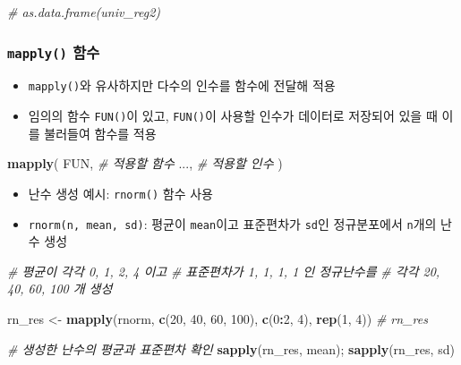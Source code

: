 \documentclass[
  11pt,
]{krantz}
\newenvironment{Shaded}{\begin{snugshade}}{\end{snugshade}}
\newcommand{\CommentTok}[1]{\textcolor[rgb]{0.37,0.37,0.37}{\textit{#1}}}
\newcommand{\DecValTok}[1]{\textcolor[rgb]{0.06,0.06,0.06}{#1}}
\newcommand{\KeywordTok}[1]{\textcolor[rgb]{0.27,0.27,0.27}{\textbf{#1}}}
\newcommand{\NormalTok}[1]{#1}
\newcommand{\OperatorTok}[1]{\textcolor[rgb]{0.43,0.43,0.43}{\textbf{#1}}}
\newcommand{\StringTok}[1]{\textcolor[rgb]{0.5,0.5,0.5}{#1}}
\providecommand{\tightlist}{%
  \setlength{\itemsep}{0pt}\setlength{\parskip}{0pt}}
\begin{document}
\begin{Shaded}
\begin{Highlighting}[]
\CommentTok{# as.data.frame(univ_reg2)}
\end{Highlighting}
\end{Shaded}

\normalsize

\hypertarget{mapply}{%
\subsubsection*{\texorpdfstring{\texttt{mapply()} 함수}{mapply() 함수}}\label{mapply}}


\begin{itemize}
\tightlist
\item
  \texttt{mapply()}와 유사하지만 다수의 인수를 함수에 전달해 적용
\item
  임의의 함수 \texttt{FUN()}이 있고, \texttt{FUN()}이 사용할 인수가 데이터로 저장되어 있을 때 이를 불러들여 함수를 적용
\end{itemize}

\footnotesize

\begin{Shaded}
\begin{Highlighting}[]
\KeywordTok{mapply}\NormalTok{(}
\NormalTok{  FUN, }\CommentTok{# 적용할 함수}
\NormalTok{  ..., }\CommentTok{# 적용할 인수}
\NormalTok{)}
\end{Highlighting}
\end{Shaded}

\normalsize

\begin{itemize}
\tightlist
\item
  난수 생성 예시: \texttt{rnorm()} 함수 사용
\item
  \texttt{rnorm(n,\ mean,\ sd)}: 평균이 \texttt{mean}이고 표준편차가 \texttt{sd}인 정규분포에서 \texttt{n}개의 난수 생성
\end{itemize}

\footnotesize

\begin{Shaded}
\begin{Highlighting}[]
\CommentTok{# 평균이 각각 0, 1, 2, 4 이고}
\CommentTok{# 표준편차가 1, 1, 1, 1 인 정규난수를 }
\CommentTok{# 각각 20, 40, 60, 100 개 생성}

\NormalTok{rn_res <-}\StringTok{ }\KeywordTok{mapply}\NormalTok{(rnorm, }
                 \KeywordTok{c}\NormalTok{(}\DecValTok{20}\NormalTok{, }\DecValTok{40}\NormalTok{, }\DecValTok{60}\NormalTok{, }\DecValTok{100}\NormalTok{), }
                 \KeywordTok{c}\NormalTok{(}\DecValTok{0}\OperatorTok{:}\DecValTok{2}\NormalTok{, }\DecValTok{4}\NormalTok{), }
                 \KeywordTok{rep}\NormalTok{(}\DecValTok{1}\NormalTok{, }\DecValTok{4}\NormalTok{))}
\CommentTok{# rn_res}

\CommentTok{# 생성한 난수의 평균과 표준편차 확인}
\KeywordTok{sapply}\NormalTok{(rn_res, mean); }\KeywordTok{sapply}\NormalTok{(rn_res, sd)}
\end{Highlighting}
\end{Shaded}
\end{document}
